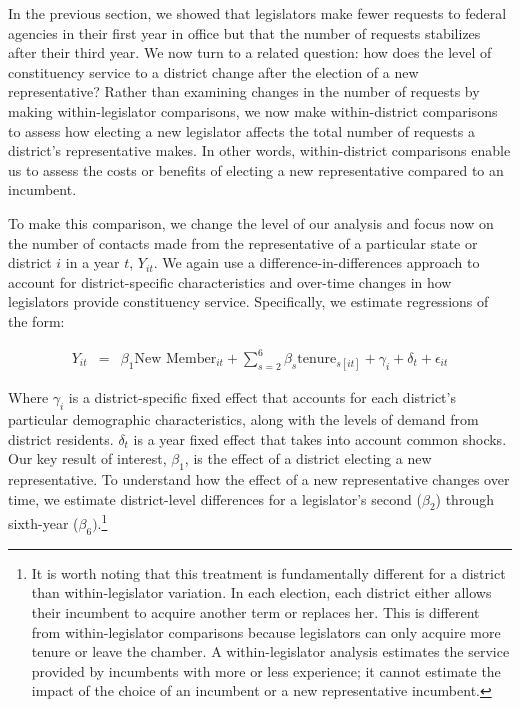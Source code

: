 \documentclass[12pt]{article}
\begin{document}
In the previous section, we showed that legislators make fewer requests to federal agencies in their first year in office but that the number of requests stabilizes after their third year. We now turn to a related question: how does the level of constituency service to a district change after the election of a new representative? Rather than examining changes in the number of requests by making within-legislator comparisons, we now make within-district comparisons to assess how electing a new legislator affects the total number of requests a district's representative makes. In other words, within-district comparisons enable us to assess the costs or benefits of electing a new representative compared to an incumbent.


To make this comparison, we change the level of our analysis and focus now on the number of contacts made from the representative of a particular state or district $i$ in a year $t$, $Y_{it}$. We again use a difference-in-differences approach to account for district-specific characteristics and over-time changes in how legislators provide constituency service. Specifically, we estimate regressions of the form: 


\begin{eqnarray}
Y_{it} & = & \beta_{1}\text{New Member}_{it} + \sum_{s = 2}^{6} \beta_{s} \text{tenure}_{s[it]} + \gamma_{i} + \delta_{t} + \epsilon_{it} \label{e:district1} 
\end{eqnarray}

Where $\gamma_{i}$ is a district-specific fixed effect that accounts for each district's particular demographic characteristics, along with the levels of demand from district residents. $\delta_{t}$ is a year fixed effect that takes into account common shocks. Our key result of interest, $\beta_{1}$, is the effect of a district electing a new representative. To understand how the effect of a new representative changes over time, we estimate district-level differences for a legislator's second ($\beta_{2}$) through sixth-year ($\beta_{6})$.\footnote{It is worth noting that this treatment is fundamentally different for a district than within-legislator variation. In each election, each district either allows their incumbent to acquire another term or replaces her. This is different from within-legislator comparisons because legislators can only acquire more tenure or leave the chamber. A within-legislator analysis estimates the service provided by incumbents with more or less experience; it cannot estimate the impact of the choice of an incumbent or a new representative incumbent.} %
\end{document}
